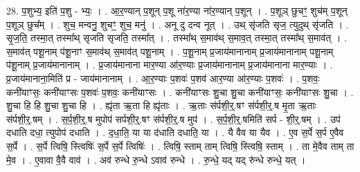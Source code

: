 \documentclass[17pt]{extarticle}
\begin{document}
28. प॒शुभ्य॒ इति॑ प॒शु - भ्यः॒ । . आ॒र॒ण्यान् प॒शून् प॒शू ना॑र॒ण्या ना॑र॒ण्यान् प॒शून् । . प॒शूञ् छुचꣳ॒॒ शुच॑म् प॒शून् प॒शूञ् छुच᳚म् । . शुच॒ मन्वनु॒ शुचꣳ॒॒ शुच॒ मनु॑ । . अनू दु दन्व नूत् । . उथ् सृ॑जति सृज॒ त्युदुथ् सृ॑जति । . सृ॒ज॒ति॒ तस्मा॒त् तस्मा᳚थ् सृजति सृजति॒ तस्मा᳚त् । . तस्मा᳚थ् स॒माव॑थ् स॒माव॒त् तस्मा॒त् तस्मा᳚थ् स॒माव॑त् । . स॒माव॑त् पशू॒नाम् प॑शू॒नाꣳ स॒माव॑थ् स॒माव॑त् पशू॒नाम् । . प॒शू॒नाम् प्र॒जाय॑मानानाम् प्र॒जाय॑मानानाम् पशू॒नाम् प॑शू॒नाम् प्र॒जाय॑मानानाम् । . प्र॒जाय॑मानाना मार॒ण्या आ॑र॒ण्याः प्र॒जाय॑मानानाम् प्र॒जाय॑मानाना मार॒ण्याः । . प्र॒जाय॑मानाना॒मिति॑ प्र - जाय॑मानानाम् । . आ॒र॒ण्याः प॒शवः॑ प॒शव॑ आर॒ण्या आ॑र॒ण्याः प॒शवः॑ । . प॒शवः॒ कनी॑याꣳसः॒ कनी॑याꣳसः प॒शवः॑ प॒शवः॒ कनी॑याꣳसः । . कनी॑याꣳसः शु॒चा शु॒चा कनी॑याꣳसः॒ कनी॑याꣳसः शु॒चा । . शु॒चा हि हि शु॒चा शु॒चा हि । . ह्यृ॑ता ऋ॒ता हि ह्यृ॑ताः । . ऋ॒ताः स॑र्पशी॒र्॒.षꣳ स॑र्पशी॒र्॒.ष मृ॒ता ऋ॒ताः स॑र्पशी॒र्॒.षम् । . स॒र्प॒शी॒र्॒.ष मुपोप॑ सर्पशी॒र्॒.षꣳ स॑र्पशी॒र्॒.ष मुप॑ । . स॒र्प॒शी॒र्॒.षमिति॑ सर्प - शी॒र्॒.षम् । . उप॑ दधाति दधा॒ त्युपोप॑ दधाति । . द॒धा॒ति॒ या या द॑धाति दधाति॒ या । . यै वैव या यैव । . ए॒व स॒र्पे स॒र्प ए॒वैव स॒र्पे । . स॒र्पे त्विषि॒ स्त्विषिः॑ स॒र्पे स॒र्पे त्विषिः॑ । . त्विषि॒ स्ताम् ताम् त्विषि॒ स्त्विषि॒ स्ताम् । . ता मे॒वैव ताम् ता मे॒व । . ए॒वावा वै॒वै वाव॑ । . अव॑ रुन्धे रु॒न्धे ऽवाव॑ रुन्धे । . रु॒न्धे॒ यद् यद् रु॑न्धे रुन्धे॒ यत् । \newline
\end{document}
